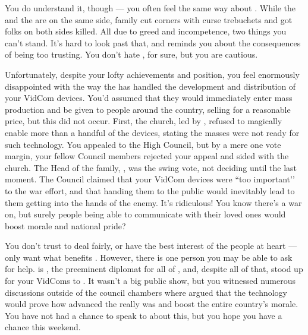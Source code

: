 \documentclass[char]{GL2020}
\begin{document}
You do understand it, though — you often feel the same way about \cLibAssist{\full}. While the \pFarm{} and the \pTech{} are on the same side, \cLibAssist{\their} family cut corners with curse trebuchets and got folks on both sides killed. All due to greed and incompetence, two things you can’t stand. It’s hard to look past that, and reminds you about the consequences of being too trusting. You don’t hate \cLibAssist{}, for sure, but you are cautious.    

Unfortunately, despite your lofty achievements and position, you feel enormously disappointed with the way the \pTech{} has handled the development and distribution of your VidCom devices.  You'd assumed that they would immediately enter mass production and be given to people around the country, selling for a reasonable price, but this did not occur. First, the church, led by \cAntiChup{\full}, refused to magically enable more than a handful of the devices, stating the masses were not ready for such technology. You appealed to the High Council, but by a mere one vote margin, your fellow Council members rejected your appeal and sided with the church. The Head of the \cHeir{\formal} family, \cFaledonParent{\full}, was the swing vote, not deciding until the last moment. The Council claimed that your VidCom devices were ``too important'’ to the war effort, and that handing them to the public would inevitably lead to them getting into the hands of the enemy. It's ridiculous!  You know there's a war on, but surely people being able to communicate with their loved ones would boost morale and national pride? 

You don't trust \cFaledonParent{} to deal fairly, or have the best interest of the people at heart — \cFaledonParent{\they} only want\cFaledonParent{\verbs} what benefits \cFaledonParent{\them}. However, there is one person you may be able to ask for help.  \cDiplomat{\full} is \cFaledonParent{\sibling}, the preeminent diplomat for all of \pTech{}, and, despite all of that, stood up for your VidComs to \cFaledonParent{\them}.  It wasn’t a big public show, but you witnessed numerous discussions outside of the council chambers where \cDiplomat{} argued that the technology would prove how advanced the \pTech{} really was and boost the entire country’s morale.  You have not had a chance to speak to \cDiplomat{} about this, but you hope you have a chance this weekend.    
\end{document}
